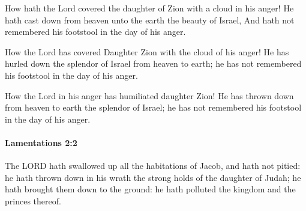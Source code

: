 			\begin{versebox}
					\item[BHS] 
					\item[LXX] 
					\item[ASV] How hath the Lord covered the daughter of Zion with a cloud in his anger! He hath cast down from heaven unto the earth the beauty of Israel, And hath not remembered his footstool in the day of his anger.
					\item[NIV] How the Lord has covered Daughter Zion with the cloud of his anger! He has hurled down the splendor of Israel from heaven to earth; he has not remembered his footstool in the day of his anger.
					\item[NRSV] How the Lord in his anger has humiliated daughter Zion! He has thrown down from heaven to earth the splendor of Israel; he has not remembered his footstool in the day of his anger.
			\end{versebox}

		\paragraph{Lamentations 2:2} %
			\label{LAMENTATIONS-2-2}

			The LORD hath swallowed up all the habitations of Jacob, and hath not pitied: he hath thrown down in his wrath the strong holds of the daughter of Judah; he hath brought them down to the ground: he hath polluted the kingdom and the princes thereof.

